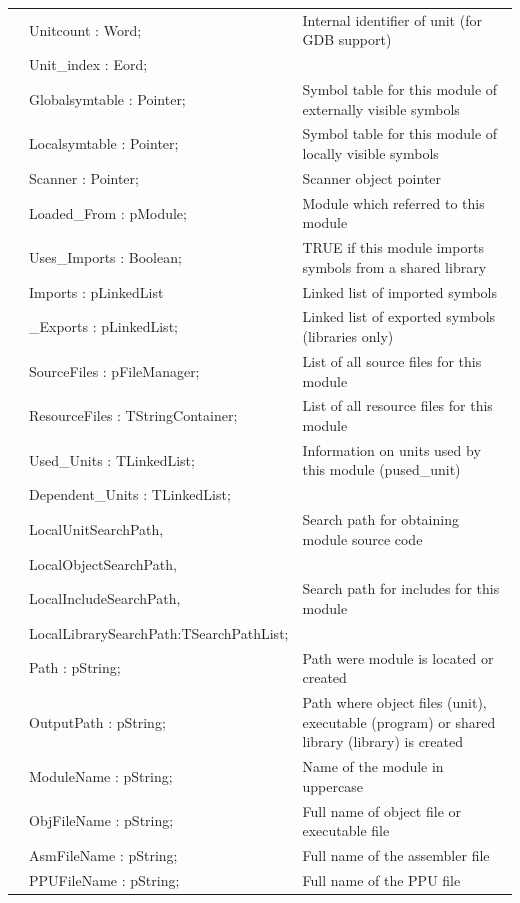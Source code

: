 \documentclass [a4paper,12pt]{article}
\begin{document}
\begin{longtable}{|l@{\extracolsep{\fill}}lp{7cm}|}
&\textsf{Unitcount : Word;}		& Internal identifier of unit (for GDB support) \\
&\textsf{Unit{\_}index : Eord;}		&  \\
&\textsf{Globalsymtable : Pointer;}	& Symbol table for this module of externally visible symbols \\
&\textsf{Localsymtable : Pointer;}	& Symbol table for this module of locally visible symbols \\
&\textsf{Scanner : Pointer;}		& Scanner object pointer \\
&\textsf{Loaded{\_}From : pModule;}	& Module which referred to this module \\
&\textsf{Uses{\_}Imports : Boolean;}	& TRUE if this module imports symbols from a shared library \\
&\textsf{Imports : pLinkedList}		& Linked list of imported symbols \\
&\textsf{{\_}Exports : pLinkedList;}	& Linked list of exported symbols (libraries only) \\
&\textsf{SourceFiles : pFileManager;}	& List of all source files for this module \\
&\textsf{ResourceFiles : TStringContainer;} & List of all resource files for this module \\
&\textsf{Used{\_}Units : TLinkedList; }	& Information on units used by this module (pused{\_}unit) \\
&\textsf{Dependent{\_}Units : TLinkedList;}&  \\
&\textsf{LocalUnitSearchPath,}& Search path for obtaining module source code \\
&\textsf{LocalObjectSearchPath,}&  \\
&\textsf{LocalIncludeSearchPath,}& Search path for includes for this module \\
&\textsf{LocalLibrarySearchPath:TSearchPathList;}&  \\
&\textsf{Path : pString;}& Path were module is located or created \\
&\textsf{OutputPath : pString;}& Path where object files (unit), executable (program) or shared library (library) is created \\
&\textsf{ModuleName : pString;}& Name of the module in uppercase \\
&\textsf{ObjFileName : pString;}& Full name of object file or executable file \\
&\textsf{AsmFileName : pString;}& Full name of the assembler file \\
&\textsf{PPUFileName : pString;}& Full name of the PPU file \\

\end{longtable}
\end{document}
